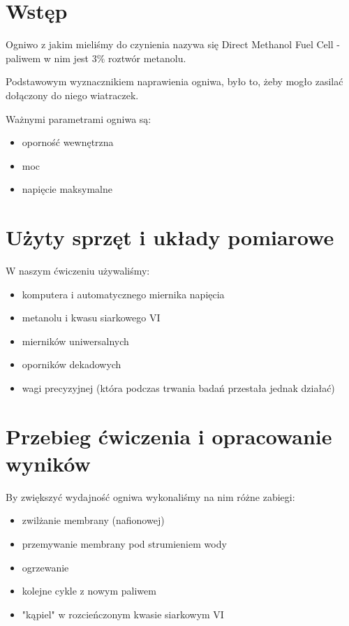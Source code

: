 \documentclass[a4paper,12pt]{article}
\begin{document}
\section{Wstęp}

Ogniwo z jakim mieliśmy do czynienia nazywa się Direct Methanol Fuel Cell - paliwem w nim jest 3$\%$ roztwór metanolu.

Podstawowym wyznacznikiem naprawienia ogniwa, było to, żeby mogło zasilać dołączony do niego wiatraczek.

Ważnymi parametrami ogniwa są:
\begin{itemize}
\item oporność wewnętrzna
\item moc
\item napięcie maksymalne
\end{itemize}
\section{Użyty sprzęt i układy pomiarowe}

W naszym ćwiczeniu używaliśmy:
\begin{itemize}
\item komputera i automatycznego miernika napięcia
\item metanolu i kwasu siarkowego VI
\item mierników uniwersalnych
\item oporników dekadowych
\item wagi precyzyjnej (która podczas trwania badań przestała jednak działać)
\end{itemize}

\section{Przebieg ćwiczenia i opracowanie wyników}




By zwiększyć wydajność ogniwa wykonaliśmy na nim różne zabiegi:
\begin{itemize}
\item zwilżanie membrany (nafionowej)
\item przemywanie membrany pod strumieniem wody
\item ogrzewanie
\item kolejne cykle z nowym paliwem
\item "kąpiel" w rozcieńczonym kwasie siarkowym VI
\end{itemize}
\end{document}
